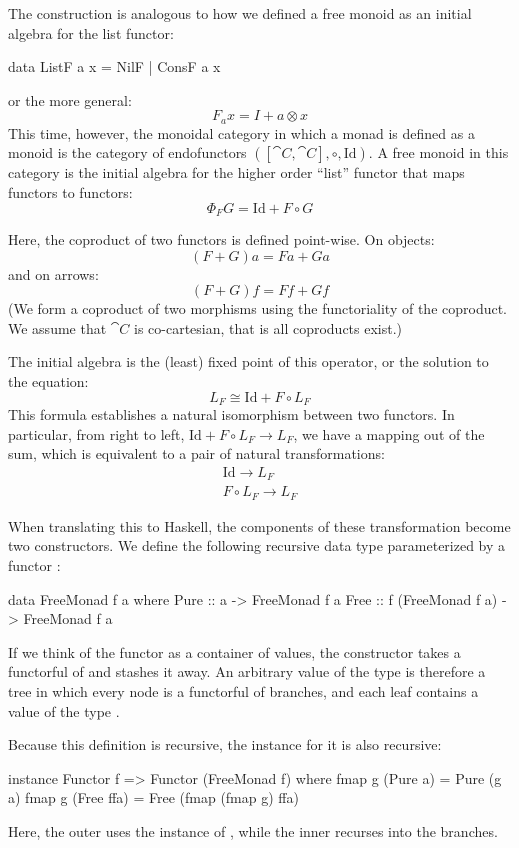 \documentclass[DaoFP]{subfiles}
\begin{document}
The construction is analogous to how we defined a free monoid as an initial algebra for the list functor:
\begin{haskell}
data ListF a x = NilF | ConsF a x
\end{haskell}
or the more general:
\[ F_a x = I + a \otimes x \]
This time, however, the monoidal category in which a monad is defined as a monoid is the category of endofunctors $([\cat C, \cat C], \circ, \text{Id})$. A free monoid in this category is the initial algebra for the higher order ``list'' functor that maps functors to functors:
\[ \Phi_F G = \text{Id} + F \circ G \]

Here, the coproduct of two functors is defined point-wise. On objects:
\[ (F + G) a = F a + G a \]
and on arrows:
\[ (F + G) f = F f + G f \]
(We form a coproduct of two morphisms using the functoriality of the coproduct. We assume that $\cat C$ is co-cartesian, that is all coproducts exist.)

The initial algebra is the (least) fixed point of this operator, or the solution to the equation:
\[ L_F \cong \text{Id} + F \circ L_F \]
This formula establishes a natural isomorphism between two functors. In particular, from right to left, $\text{Id} + F \circ L_F \to L_F$, we have a mapping out of the sum, which is equivalent to a pair of natural transformations:
\begin{align*}
\text{Id} \to L_F
\\
F \circ L_F \to L_F
\end{align*}

When translating this to Haskell, the components of these transformation become two constructors. We define the following recursive data type parameterized by a functor :
\begin{haskell}
data FreeMonad f a where
   Pure :: a -> FreeMonad f a
   Free :: f (FreeMonad f a) -> FreeMonad f a
\end{haskell}

If we think of the functor  as a container of values, the constructor  takes a functorful of  and stashes it away. An arbitrary value of the type  is therefore a tree in which every node is a functorful of branches, and each leaf contains a value of the type .

Because this definition is recursive, the  instance for it is also recursive:
\begin{haskell}
instance Functor f => Functor (FreeMonad f) where
  fmap g (Pure a) = Pure (g a)
  fmap g (Free ffa) = Free (fmap (fmap g) ffa)
\end{haskell}
Here, the outer  uses the  instance of , while the inner  recurses into the branches.
\end{document}
